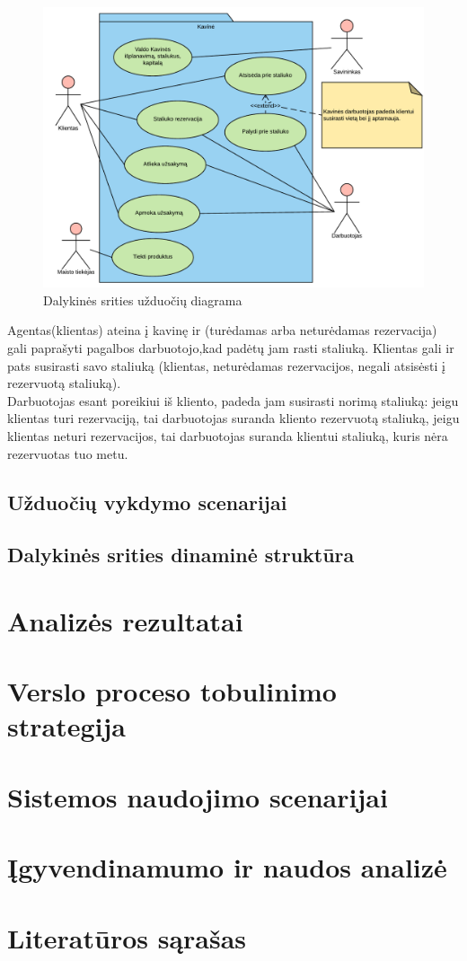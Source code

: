 \documentclass{VUMIFPSkursinis}
\begin{document}
	\begin {figure}[H]
	\centering
		\caption{Dalykinės srities užduočių diagrama}
		\includegraphics[scale=0.9]{img/3lab/Diagrama2}
		
		\label{fig:ER}
	\end{figure}


Agentas(klientas) ateina į kavinę ir (turėdamas arba neturėdamas rezervacija) gali paprašyti pagalbos darbuotojo,kad padėtų jam rasti  staliuką. Klientas gali ir pats susirasti savo staliuką (klientas, neturėdamas rezervacijos, negali atsisėsti į rezervuotą staliuką). \\
Darbuotojas esant poreikiui iš kliento, padeda jam susirasti norimą staliuką: jeigu klientas turi rezervaciją, tai darbuotojas suranda kliento rezervuotą staliuką, jeigu klientas neturi rezervacijos, tai darbuotojas suranda klientui staliuką, kuris nėra rezervuotas tuo metu.\\


\subsection{Užduočių vykdymo scenarijai}




\subsection{Dalykinės srities dinaminė struktūra}

\section{Analizės rezultatai}

\section{Verslo proceso tobulinimo strategija}

\section{Sistemos naudojimo scenarijai}

\section{Įgyvendinamumo ir naudos analizė}

\section{Literatūros sąrašas}
\end{document}
